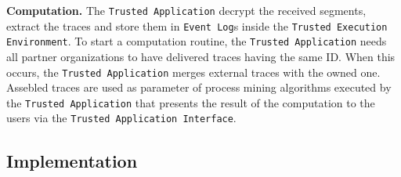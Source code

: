 \textbf{Computation.} The \texttt{Trusted Application} decrypt the received segments, extract the traces and store them in \texttt{Event Log}s inside the \texttt{Trusted Execution Environment}. To start a computation routine, the \texttt{Trusted Application} needs all partner organizations to have delivered traces having the same ID. When this occurs, the \texttt{Trusted Application} merges external traces with the owned one. Assebled traces are used as parameter of process mining algorithms executed by the \texttt{Trusted Application} that presents the result of the computation to the users via the \texttt{Trusted Application Interface}.
\subsection{Implementation}
